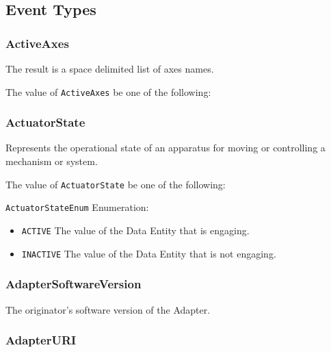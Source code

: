 \subsection{Event Types} \label{sec:Event Types}

\subsubsection{ActiveAxes}
\label{sec:ActiveAxes}



The result is a space delimited list of axes names.


The value of \texttt{ActiveAxes} \MUST be one of the following: 

\FloatBarrier

\subsubsection{ActuatorState}
\label{sec:ActuatorState}



Represents the operational state of an apparatus for moving or controlling a mechanism or system.


The value of \texttt{ActuatorState} \MUST be one of the following: 


\texttt{ActuatorStateEnum} Enumeration:

\begin{itemize}
\item \texttt{ACTIVE} \newline The value of the \gls{Data Entity} that is engaging. 
\item \texttt{INACTIVE} \newline The value of the \gls{Data Entity} that is not engaging. 
\end{itemize}

\FloatBarrier

\subsubsection{AdapterSoftwareVersion}
\label{sec:AdapterSoftwareVersion}



The originator’s software version of the \gls{Adapter}.


\subsubsection{AdapterURI}
\label{sec:AdapterURI}



